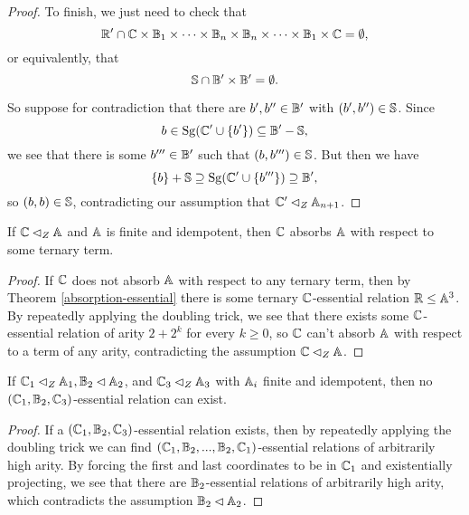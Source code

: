 \documentclass[letterpaper,11pt]{article}
\DeclareMathOperator{\Sg}{Sg}
\begin{document}
\begin{proof}
To finish, we just need to check that
\[
\mathbb{R}' \cap \mathbb{C}\times\mathbb{B}_1\times \cdots \times \mathbb{B}_n \times \mathbb{B}_n \times \cdots \times \mathbb{B}_1 \times \mathbb{C} = \emptyset,
\]
or equivalently, that
\[
\mathbb{S} \cap \mathbb{B}'\times \mathbb{B}' = \emptyset.
\]

So suppose for contradiction that there are $b',b'' \in \mathbb{B}'$ with $(b',b'') \in \mathbb{S}$. Since
\[
b \in \Sg(\bC' \cup \{b'\}) \subseteq \bB' - \bS,
\]
we see that there is some $b''' \in \mathbb{B}'$ such that $(b,b''') \in \mathbb{S}$. But then we have
\[
\{b\} + \bS \supseteq \Sg(\bC' \cup \{b'''\}) \supseteq \bB',
\]
so $(b,b) \in \mathbb{S}$, contradicting our assumption that $\mathbb{C}' \lhd_Z \mathbb{A}_{n+1}$.
\end{proof}

\begin{cor}\label{center-ternary} If $\mathbb{C} \lhd_Z \mathbb{A}$ and $\mathbb{A}$ is finite and idempotent, then $\mathbb{C}$ absorbs $\mathbb{A}$ with respect to some ternary term.
\end{cor}
\begin{proof} If $\mathbb{C}$ does not absorb $\mathbb{A}$ with respect to any ternary term, then by Theorem \ref{absorption-essential} there is some ternary $\mathbb{C}$-essential relation $\mathbb{R} \le \mathbb{A}^3$. By repeatedly applying the doubling trick, we see that there exists some $\mathbb{C}$-essential relation of arity $2+2^k$ for every $k \ge 0$, so $\mathbb{C}$ can't absorb $\mathbb{A}$ with respect to a term of any arity, contradicting the assumption $\mathbb{C} \lhd_Z \mathbb{A}$.
\end{proof}

\begin{cor} If $\mathbb{C}_1 \lhd_Z \mathbb{A}_1, \mathbb{B}_2 \lhd \mathbb{A}_2$, and $\mathbb{C}_3 \lhd_Z \mathbb{A}_3$ with $\mathbb{A}_i$ finite and idempotent, then no $(\mathbb{C}_1, \mathbb{B}_2, \mathbb{C}_3)$-essential relation can exist.
\end{cor}
\begin{proof} If a $(\mathbb{C}_1, \mathbb{B}_2, \mathbb{C}_3)$-essential relation exists, then by repeatedly applying the doubling trick we can find $(\mathbb{C}_1, \mathbb{B}_2, ..., \mathbb{B}_2, \mathbb{C}_1)$-essential relations of arbitrarily high arity. By forcing the first and last coordinates to be in $\mathbb{C}_1$ and existentially projecting, we see that there are $\mathbb{B}_2$-essential relations of arbitrarily high arity, which contradicts the assumption $\mathbb{B}_2 \lhd \mathbb{A}_2$.
\end{proof}
\end{document}
